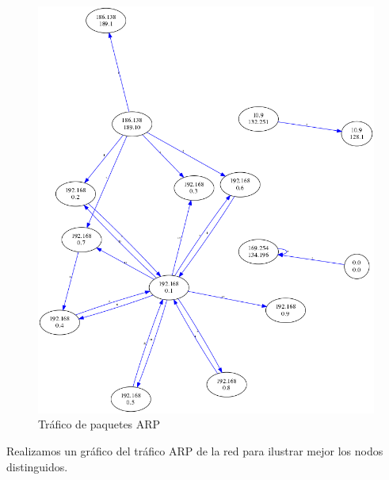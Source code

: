 \begin{figure}[H]
       \centering
       \includegraphics[width=1\textwidth]{../resultados/Casa/network.png}
       \caption{Tráfico de paquetes ARP}
       \label{red-hogarena-arp-traffic}
\end{figure}

Realizamos un gráfico del tráfico ARP de la red para ilustrar mejor los nodos distinguidos.
